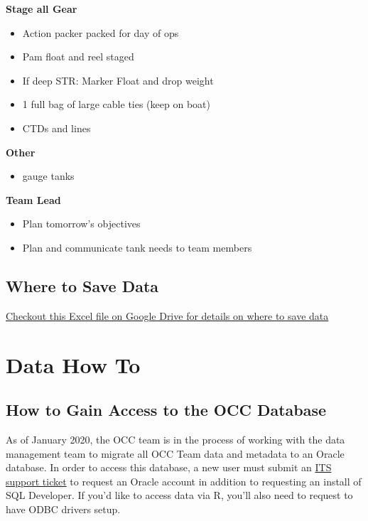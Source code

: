 \documentclass[]{book}
\providecommand{\tightlist}{%
  \setlength{\itemsep}{0pt}\setlength{\parskip}{0pt}}
\begin{document}
\textbf{Stage all Gear}

\begin{itemize}
\tightlist
\item
  Action packer packed for day of ops
\item
  Pam float and reel staged
\item
  If deep STR: Marker Float and drop weight
\item
  1 full bag of large cable ties (keep on boat)
\item
  CTDs and lines
\end{itemize}

\textbf{Other}

\begin{itemize}
\tightlist
\item
  gauge tanks
\end{itemize}

\textbf{Team Lead}

\begin{itemize}
\tightlist
\item
  Plan tomorrow's objectives
\item
  Plan and communicate tank needs to team members
\end{itemize}

\section{Where to Save Data}\label{where-to-save-data}

\href{https://drive.google.com/open?id=16l1OQgGEunLoADh_MEGyIfbQL2w0u6aw}{Checkout
this Excel file on Google Drive for details on where to save data}

\chapter{Data How To}\label{data_how_to}

\section{How to Gain Access to the OCC
Database}\label{how-to-gain-access-to-the-occ-database}

As of January 2020, the OCC team is in the process of working with the
data management team to migrate all OCC Team data and metadata to an
Oracle database. In order to access this database, a new user must
submit an
\href{https://www.st.nmfs.noaa.gov/jira/login.jsp?permissionViolation=true\&os_destination=\%2Fbrowse\%2FPICITS-181121\%3Ffilter\%3D-2\&page_caps=\&user_role=}{ITS
support ticket} to request an Oracle account in addition to requesting
an install of SQL Developer. If you'd like to access data via R, you'll
also need to request to have ODBC drivers setup.
\end{document}
